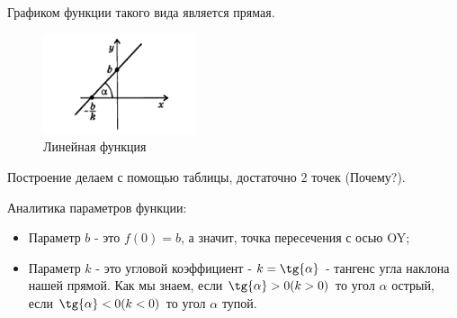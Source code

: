Графиком функции такого вида является прямая. 

\begin{figure}[h!]
	\centering
	\includegraphics[width=0.4\textwidth]{img/lin.png}
	\caption{Линейная функция}
\end{figure}

Построение делаем с помощью таблицы, достаточно 2 точек (Почему?).

Аналитика параметров функции:

\begin{itemize}
    \item Параметр $b$ - это $f(0) = b$, а значит, точка пересечения с осью OY;
    \item Параметр $k$ - это угловой коэффициент - $k = \tg{\alpha}$ - тангенс угла наклона нашей прямой. Как мы знаем, если $
    \tg{\alpha} > 0 (k > 0)$ то угол $\alpha$ острый, если  $
    \tg{\alpha} < 0 (k < 0)$ то угол $\alpha$ тупой.
\end{itemize}

